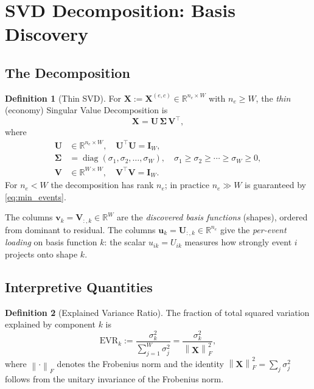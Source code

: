 \documentclass[11pt,a4paper]{article}
\theoremstyle{definition}
\newtheorem{definition}{Definition}[section]
\theoremstyle{plain}
\newcommand{\R}{\mathbb{R}}
\newcommand{\Xmat}{\mathbf{X}}
\newcommand{\Umat}{\mathbf{U}}
\newcommand{\Smat}{\boldsymbol{\Sigma}}
\newcommand{\Vmat}{\mathbf{V}}
\newcommand{\bvec}[1]{\mathbf{#1}}
\newcommand{\norm}[1]{\left\lVert #1 \right\rVert}
\newcommand{\diag}{\operatorname{diag}}
\begin{document}
\section{SVD Decomposition: Basis Discovery}
\label{sec:svd}

\subsection{The Decomposition}

\begin{definition}[Thin SVD]
\label{def:svd}
For $\Xmat := \Xmat^{(e,c)} \in \R^{n_e \times W}$ with $n_e \geq W$, the
\emph{thin} (economy) Singular Value Decomposition is
\begin{equation}
    \Xmat = \Umat \, \Smat \, \Vmat^\top,
    \label{eq:svd}
\end{equation}
where
\begin{align}
    \Umat &\in \R^{n_e \times W}, \quad \Umat^\top \Umat = \mathbf{I}_W, \\
    \Smat &= \diag(\sigma_1, \sigma_2, \ldots, \sigma_W),
             \quad \sigma_1 \geq \sigma_2 \geq \cdots \geq \sigma_W \geq 0, \\
    \Vmat &\in \R^{W \times W}, \quad \Vmat^\top \Vmat = \mathbf{I}_W.
\end{align}
For $n_e < W$ the decomposition has rank $n_e$; in practice $n_e \gg W$ is guaranteed by
\eqref{eq:min_events}.
\end{definition}

The columns $\bvec{v}_k = \Vmat_{:,k} \in \R^W$ are the \emph{discovered basis
functions} (shapes), ordered from dominant to residual. The columns $\bvec{u}_k =
\Umat_{:,k} \in \R^{n_e}$ give the \emph{per-event loading} on basis function $k$: the
scalar $u_{ik} = U_{ik}$ measures how strongly event $i$ projects onto shape $k$.

\subsection{Interpretive Quantities}

\begin{definition}[Explained Variance Ratio]
\label{def:evr}
The fraction of total squared variation explained by component $k$ is
\begin{equation}
    \mathrm{EVR}_k :=
    \frac{\sigma_k^2}{\displaystyle\sum_{j=1}^{W} \sigma_j^2}
    = \frac{\sigma_k^2}{\norm{\Xmat}_F^2},
    \label{eq:evr}
\end{equation}
where $\norm{\cdot}_F$ denotes the Frobenius norm and the identity
$\norm{\Xmat}_F^2 = \sum_j \sigma_j^2$ follows from the unitary invariance of the
Frobenius norm.
\end{definition}
\end{document}
